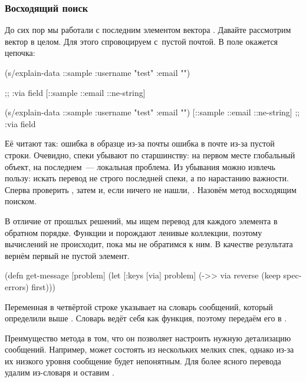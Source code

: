 \subsubsection*{Восходящий поиск}

До сих пор мы работали с последним элементом вектора . Давайте
рассмотрим вектор в целом. Для этого спровоцируем  с~пустой
почтой. В поле  окажется цепочка:

\ifnarrow


\begin{clojure}
(s/explain-data ::sample
  {:username "test" :email ""})

;; :via field
[::sample ::email ::ne-string]
\end{clojure}


\else


\begin{clojure}
(s/explain-data ::sample {:username "test" :email ""})
[::sample ::email ::ne-string] ;; :via field
\end{clojure}


\fi

Её читают так: ошибка в образце из-за почты \arr{} ошибка в почте из-за
пустой строки. Очевидно, спеки убывают по старшинству: на первом месте
глобальный объект, на последнем~--- локальная проблема. Из убывания можно
извлечь пользу: искать перевод не строго последней спеки, а по нарастанию
важности. Сперва проверить , затем  и, если
ничего не нашли, . Назовём метод восходящим поиском.


В отличие от прошлых решений, мы ищем перевод для каждого элемента в обратном
порядке. Функции  и  порождают ленивые коллекции,
поэтому вычислений не происходит, пока мы не обратимся к ним. В качестве
результата вернём первый не пустой элемент.


\begin{clojure/lines}
(defn get-message
  [problem]
  (let [{:keys [via]} problem]
    (->> via
         reverse
         (keep spec-errors)
         first)))
\end{clojure/lines}


Переменная  в четвёртой строке указывает на словарь сообщений,
который определили выше . Словарь ведёт себя как функция,
поэтому передаём его в .

Преимущество метода в том, что он позволяет настроить нужную детализацию
сообщений. Например,  может состоять из нескольких мелких спек,
однако из-за их низкого уровня сообщение будет непонятным. Для более ясного
перевода удалим из-словаря  и оставим .

